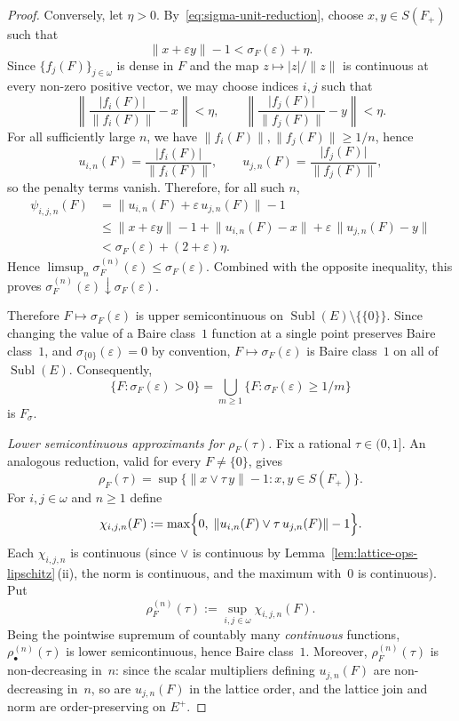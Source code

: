 \documentclass[12pt]{amsart}
\renewcommand{\le}{\leqslant}
\renewcommand{\ge}{\geqslant}
\theoremstyle{plain}
\theoremstyle{definition}
\theoremstyle{remark}
\DeclareMathOperator{\Subl}{Subl}
\begin{document}
\begin{proof}
Conversely, let $\eta > 0$.
By~\eqref{eq:sigma-unit-reduction}, choose $x,y \in S(F_+)$ such that
\[
    \lVert x + \varepsilon y \rVert - 1
    < \sigma_F(\varepsilon) + \eta.
\]
Since $\{f_j(F)\}_{j \in \omega}$ is dense in $F$ and the map
$z \mapsto \lvert z \rvert/\lVert z \rVert$ is continuous at every non-zero
positive vector, we may choose indices $i,j$ such that
\[
    \left\lVert
    \frac{\lvert f_i(F) \rvert}{\lVert f_i(F) \rVert} - x
    \right\rVert < \eta,
    \qquad
    \left\lVert
    \frac{\lvert f_j(F) \rvert}{\lVert f_j(F) \rVert} - y
    \right\rVert < \eta.
\]
For all sufficiently large $n$, we have
$\lVert f_i(F) \rVert,\lVert f_j(F) \rVert \ge 1/n$, hence
\[
    u_{i,n}(F)=\frac{\lvert f_i(F) \rvert}{\lVert f_i(F) \rVert},
    \qquad
    u_{j,n}(F)=\frac{\lvert f_j(F) \rvert}{\lVert f_j(F) \rVert},
\]
so the penalty terms vanish.
Therefore, for all such $n$,
\[
\begin{aligned}
    \psi_{i,j,n}(F)
    &= \lVert u_{i,n}(F) + \varepsilon\,u_{j,n}(F) \rVert - 1 \\
    &\le \lVert x + \varepsilon y \rVert - 1
       + \lVert u_{i,n}(F) - x \rVert
       + \varepsilon\,\lVert u_{j,n}(F) - y \rVert \\
    &< \sigma_F(\varepsilon) + (2+\varepsilon)\eta.
\end{aligned}
\]
Hence
$\limsup_n \sigma^{(n)}_F(\varepsilon) \le \sigma_F(\varepsilon)$.
Combined with the opposite inequality, this proves
$\sigma^{(n)}_F(\varepsilon)\downarrow \sigma_F(\varepsilon)$.

Therefore $F \mapsto \sigma_F(\varepsilon)$ is upper semicontinuous on
$\Subl(E)\setminus\{\{0\}\}$.
Since changing the value of a Baire class~$1$ function at a single point preserves
Baire class~$1$, and $\sigma_{\{0\}}(\varepsilon)=0$ by convention,
$F \mapsto \sigma_F(\varepsilon)$ is Baire class~$1$ on all of $\Subl(E)$.
Consequently,
\[
    \{F \colon \sigma_F(\varepsilon) > 0\}
    = \bigcup_{m \ge 1} \{F \colon \sigma_F(\varepsilon) \ge 1/m\}
\]
is $F_\sigma$.

\smallskip
\emph{Lower semicontinuous approximants for $\rho_F(\tau)$.}
Fix a rational $\tau \in (0, 1]$.  An analogous reduction, valid for every
$F \ne \{0\}$, gives
\begin{equation}\label{eq:rho-unit-reduction}
    \rho_F(\tau)
    = \sup\bigl\{\lVert x \vee \tau\, y \rVert - 1
      \colon x, y \in S(F_+)\bigr\}.
\end{equation}
For $i, j \in \omega$ and $n \ge 1$ define
\[
    \chi_{i,j,n}(F)
    := \max\Bigl\{0,\;
    \lVert u_{i,n}(F) \vee \tau\, u_{j,n}(F) \rVert - 1\Bigr\}.
\]
Each $\chi_{i,j,n}$ is continuous (since $\vee$ is continuous by
Lemma~\ref{lem:lattice-ops-lipschitz}\,(ii), the norm is continuous, and the
maximum with~$0$ is continuous).  Put
\[
    \rho^{(n)}_F(\tau) := \sup_{i,j \in \omega} \chi_{i,j,n}(F).
\]
Being the pointwise supremum of countably many \emph{continuous} functions,
$\rho^{(n)}_\bullet(\tau)$ is lower semicontinuous, hence Baire class~$1$.
Moreover, $\rho^{(n)}_F(\tau)$ is non-decreasing in~$n$: since the scalar
multipliers defining $u_{j,n}(F)$ are non-decreasing in~$n$, so are
$u_{j,n}(F)$ in the lattice order, and the lattice join and norm are
order-preserving on $E^+$.


\end{proof}
\end{document}
